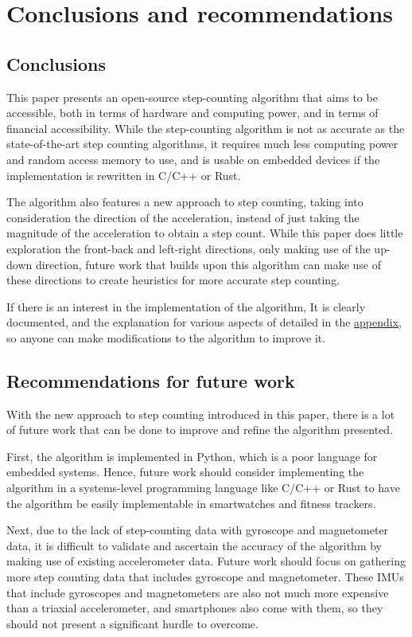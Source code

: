 \documentclass[12pt]{report}
\begin{document}
\chapter{Conclusions and recommendations}
\label{sec:orgf1398dc}
\label{orgfc370b4}
\section{Conclusions}
\label{sec:org66e169c}
This paper presents an open-source step-counting algorithm that aims
to be accessible, both in terms of hardware and computing power, and
in terms of financial accessibility. While the step-counting algorithm
is not as accurate as the state-of-the-art step counting algorithms,
it requires much less computing power and random access memory to use,
and is usable on embedded devices if the implementation is rewritten
in C/C++ or Rust.

The algorithm also features a new approach to step counting,
taking into consideration the direction of the acceleration,
instead of just taking the magnitude of the acceleration to
obtain a step count. While this paper does little exploration
the front-back and left-right directions, only making use of the
up-down direction, future work that builds upon this algorithm
can make use of these directions to create heuristics
for more accurate step counting.

If there is an interest in the implementation of the algorithm,
It is clearly documented, and the explanation for
various aspects of detailed in the \hyperref[orgf85d410]{appendix},
so anyone can make modifications to the algorithm to improve it.
\section{Recommendations for future work}
\label{sec:orgc63f292}
With the new approach to step counting introduced in this paper,
there is a lot of future work that can be done to improve and refine
the algorithm presented.

First, the algorithm is implemented in Python, which is a poor language
for embedded systems. Hence, future work should consider implementing
the algorithm in a systems-level programming language like
C/C++ or Rust to have the algorithm be easily implementable in
smartwatches and fitness trackers.

Next, due to the lack of step-counting data with gyroscope
and magnetometer data, it is difficult to validate and ascertain
the accuracy of the algorithm by making use of existing
accelerometer data. Future work should focus on gathering more
step counting data that includes gyroscope and magnetometer.
These IMUs that include gyroscopes and magnetometers are
also not much more expensive than a triaxial accelerometer,
and smartphones also come with them, so they should not present
a significant hurdle to overcome.
\end{document}

